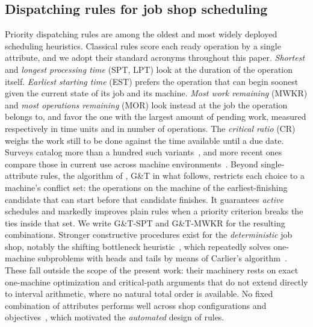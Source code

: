 \documentclass[review,authoryear,11pt]{elsarticle}
\begin{document}
\subsection{Dispatching rules for job shop scheduling}
Priority dispatching rules are among the oldest and most widely
deployed scheduling heuristics. Classical rules
score each ready operation by a single attribute, and we adopt their
standard acronyms throughout this paper. \emph{Shortest} and
\emph{longest processing time} (SPT, LPT) look at the duration of the
operation itself. \emph{Earliest starting time} (EST) prefers the
operation that can begin soonest given the current state of its job and
its machine. \emph{Most work remaining} (MWKR) and \emph{most operations
remaining} (MOR) look instead at the job the operation belongs to, and
favor the one with the largest amount of pending work, measured
respectively in time units and in number of operations. The
\emph{critical ratio} (CR) weighs the work still to be done against the
time available until a due date. Surveys catalog more than a hundred
such variants~\citep{Panwalkar1977,Haupt1989}, and more recent ones
compare those in current use across machine
environments~\citep{Durasevic2018}. Beyond single-attribute rules, the algorithm of
\citet{Giffler1960}, G\&T in what follows, restricts each choice to a
machine's conflict set: the operations on the machine of the
earliest-finishing candidate that can start before that candidate
finishes. It guarantees \emph{active} schedules and markedly improves
plain rules when a priority criterion breaks the ties inside that set.
We write G\&T-SPT and G\&T-MWKR for the resulting combinations. Stronger constructive procedures exist
for the \emph{deterministic} job shop, notably the shifting bottleneck
heuristic~\citep{Adams1988}, which repeatedly solves one-machine
subproblems with heads and tails by means of Carlier's
algorithm~\citep{Carlier1982}. These fall outside the scope of the present work: their machinery rests
on exact one-machine optimization and critical-path arguments that do
not extend directly to interval arithmetic, where no natural total order
is available. No fixed combination of attributes performs well across shop
configurations and objectives~\citep{Haupt1989}, which motivated the
\emph{automated} design of rules.
\end{document}
